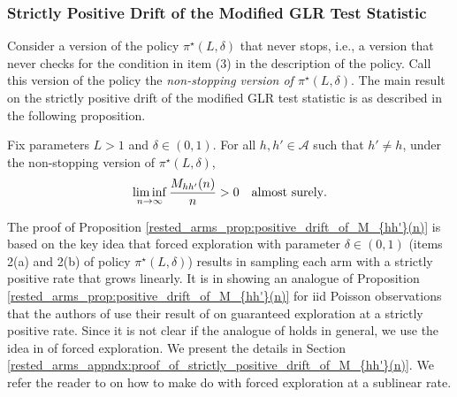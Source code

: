 \subsubsection{Strictly Positive Drift of the Modified GLR Test Statistic}\label{rested_arms_subsubsec:positive_drift}
Consider a version of the policy $\pi^\star(L, \delta)$ that never stops, i.e., a version that never checks for the condition in item (3) in the description of the policy. Call this version of the policy the {\em non-stopping version of $\pi^\star(L, \delta)$}. The main result on the strictly positive drift of the modified GLR test statistic is as described in the following proposition.
\begin{prop}\label{rested_arms_prop:positive_drift_of_M_{hh'}(n)}
	Fix parameters $L>1$ and $\delta\in(0,1)$. For all $h, h'\in \mathcal{A}$ such that $h'\neq h$, under the non-stopping version of $\pi^\star(L, \delta)$,
	\begin{equation}
		\liminf\limits_{n\to\infty}\frac{M_{hh'}(n)}{n}>0\quad \text{\text{almost surely}}.\label{rested_arms_eq:positive_drift_of_M_{hh'}(n)}
	\end{equation}
\end{prop}
The proof of Proposition \ref{rested_arms_prop:positive_drift_of_M_{hh'}(n)} is based on the key idea that forced exploration with parameter $\delta\in(0,1)$ (items 2(a) and 2(b) of policy $\pi^\star(L,\delta)$) results in sampling each arm with a strictly positive rate that grows linearly. It is in showing an analogue of Proposition \ref{rested_arms_prop:positive_drift_of_M_{hh'}(n)} for iid Poisson observations that the authors of \cite{vaidhiyan2017learning} use their result of \cite[Proposition 3]{vaidhiyan2017learning} on guaranteed exploration at a strictly positive rate. Since it is not clear if the analogue of \cite[Proposition 3]{vaidhiyan2017learning} holds in general, we use the idea in \cite{albert1961sequential} of forced exploration. We present the details in Section \ref{rested_arms_appndx:proof_of_strictly_positive_drift_of_M_{hh'}(n)}. We refer the reader to \cite{garivier2016optimal} on how to make do with forced exploration at a sublinear rate.



